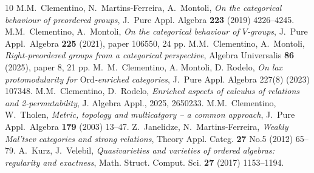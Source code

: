 \documentclass[10pt,a4paper]{amsart}
\theoremstyle{plain}
\theoremstyle{definition}
\theoremstyle{remark}
\begin{document}
\begin{thebibliography}{10}
 M.M.~Clementino, N.~Martins-Ferreira, A.~Montoli, \emph{On the categorical behaviour of preordered groups}, {J.~Pure} Appl. Algebra \textbf{223} (2019) 4226--4245.
 M.M.~Clementino, A.~Montoli, \emph{On the categorical behaviour of $V$-groups}, J.~Pure Appl.~Algebra \textbf{225} (2021), paper 106550, 24 pp.
 M.M.~Clementino, A.~Montoli, \emph{Right-preordered groups from a categorical perspective}, Algebra Universalis \textbf{86} (2025), paper 8, 21 pp.
  M.~M.~Clementino, A. Montoli, D. Rodelo, \emph{On lax protomodularity for $\mathrm{Ord}$-enriched categories}, {J.~Pure} Appl. Algebra 227(8) (2023) 107348.
 M.M.~Clementino, D.~Rodelo, \emph{Enriched aspects of calculus of relations and 2-permutability}, J. Algebra Appl., 2025, 2650233.
 M.M.~Clementino, W.~Tholen, \emph{Metric, topology and multicatgory -- a common approach}, J.~Pure Appl.~Algebra \textbf{179} (2003) 13--47.
 Z.~Janelidze, N.~Martins-Ferreira, \emph{Weakly Mal'tsev categories and strong relations}, Theory Appl. Categ. \textbf{27} No.5 (2012) 65--79.
 A.~Kurz, J.~Velebil, \emph{Quasivarieties and varieties of ordered algebras: regularity and exactness}, Math. Struct. Comput. Sci. \textbf{27} (2017) 1153--1194.

\end{thebibliography}
\end{document}
